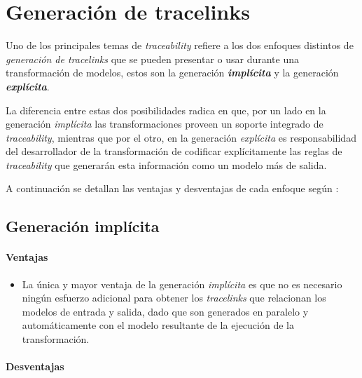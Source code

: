 \documentclass[a4paper,12pt,oneside,spanish]{book}
\begin{document}
\section{Generación de tracelinks}

Uno de los principales temas de \textit{traceability} refiere a los dos enfoques distintos de \textit{generación de tracelinks} que se pueden presentar o usar durante una transformación de modelos, estos son la generación \textit{\textbf{implícita}} y la generación \textit{\textbf{explícita}}. 

La diferencia entre estas dos posibilidades radica en que, por un lado en la generación \textit{implícita} las transformaciones proveen un soporte integrado de \textit{traceability}, mientras que por el otro, en la generación \textit{explícita} es responsabilidad del desarrollador de la transformación de codificar explícitamente las reglas de \textit{traceability} que generarán esta información como un modelo más de salida.

A continuación se detallan las ventajas y desventajas de cada enfoque según \cite{GrammelVoigt}:


\subsection{Generación implícita}

\paragraph{Ventajas}

\begin{itemize}[label={\checkmark}]

\item La única y mayor ventaja de la generación \textit{implícita} es que no es necesario ningún esfuerzo adicional para obtener los \textit{tracelinks} que relacionan los modelos de entrada y salida, dado que son generados en paralelo y automáticamente con el modelo resultante de la ejecución de la transformación.

\end{itemize}

\paragraph{Desventajas}
\end{document}
